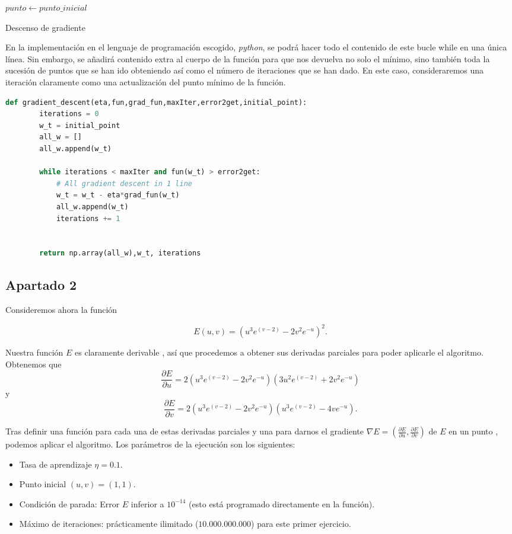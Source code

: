 \documentclass[12pt]{scrartcl}
\begin{document}
{\begin{algorithm}[H]
 $punto  \leftarrow punto\_inicial$ \;
 \caption{Descenso de gradiente}
\end{algorithm}

En la implementación en el lenguaje de programación escogido, \emph{python}, se podrá hacer todo el contenido de este bucle while en una única línea.
Sin embargo, se añadirá contenido extra al cuerpo de la función para que nos devuelva no solo el mínimo, sino también toda la sucesión de puntos
que se han ido obteniendo así como el número de iteraciones que se han dado. En este caso, consideraremos una iteración claramente como una actualización del punto mínimo
de la función. \\

\begin{lstlisting}[language=Python]
    def gradient_descent(eta,fun,grad_fun,maxIter,error2get,initial_point):
	    iterations = 0
	    w_t = initial_point
	    all_w = []
	    all_w.append(w_t)

	    while iterations < maxIter and fun(w_t) > error2get:
		    # All gradient descent in 1 line
		    w_t = w_t - eta*grad_fun(w_t)
		    all_w.append(w_t)
		    iterations += 1
	

	    return np.array(all_w),w_t, iterations
\end{lstlisting}


\subsection*{Apartado 2}
Consideremos ahora la función

$$
E(u,v) = \left( u^3 e^{(v-2)} - 2v^2 e^{-u}\right)^2.
$$


Nuestra función $E$ es claramente derivable , así que procedemos a obtener sus derivadas parciales para poder aplicarle el algoritmo. Obtenemos que
$$
\frac{\partial E}{\partial u} = 2 \left( u^3 e^{(v-2)} - 2v^2 e^{-u}\right)\left( 3u^2 e^{(v-2)} + 2v^2 e^{-u}\right)
$$
y
$$
\frac{\partial E}{\partial v} = 2 \left( u^3 e^{(v-2)} - 2v^2 e^{-u}\right) \left( u^3 e^{(v-2)} - 4v e^{-u}\right).
$$

Tras definir una función para cada una de estas derivadas parciales y una para darnos el gradiente $\nabla E = \left(\frac{\partial E}{\partial u}, \frac{\partial E}{\partial v}\right)$ de $E$ en un punto
, podemos aplicar el algoritmo. Los parámetros de la ejecución son los siguientes:
\begin{itemize}
\item Tasa de aprendizaje $\eta = 0.1$.
\item Punto inicial $(u,v) = (1,1)$.
\item Condición de parada: Error $E$ inferior a $10^{-14}$ (esto está programado directamente en la función).
\item Máximo de iteraciones: prácticamente ilimitado ($10.000.000.000$) para este primer ejercicio.
\end{itemize}

}
\end{document}
